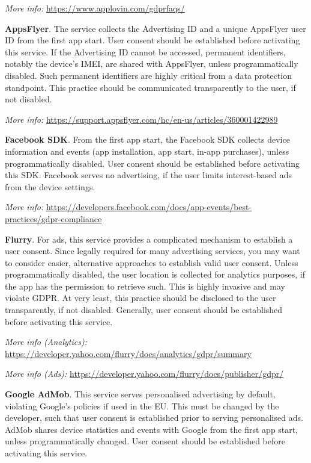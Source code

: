 \documentclass[
]{book}
\begin{document}
\emph{More info:} \url{https://www.applovin.com/gdprfaqs/}

\textbf{AppsFlyer}. The service collects the Advertising ID and a unique AppsFlyer user ID from the first app start. User consent should be established before activating this service. If the Advertising ID cannot be accessed, permanent identifiers, notably the device's IMEI, are shared with AppsFlyer, unless programmatically disabled. Such permanent identifiers are highly critical from a data protection standpoint. This practice should be communicated transparently to the user, if not disabled.

\emph{More info:} \url{https://support.appsflyer.com/hc/en-us/articles/360001422989}

\textbf{Facebook SDK}. From the first app start, the Facebook SDK collects device information and events (app installation, app start, in-app purchases), unless programmatically disabled. User consent should be established before activating this SDK. Facebook serves no advertising, if the user limits interest-based ads from the device settings.

\emph{More info:} \url{https://developers.facebook.com/docs/app-events/best-practices/gdpr-compliance}

\textbf{Flurry}. For ads, this service provides a complicated mechanism to establish a user consent. Since legally required for many advertising services, you may want to consider easier, alternative approaches to establish valid user consent. Unless programmatically disabled, the user location is collected for analytics purposes, if the app has the permission to retrieve such. This is highly invasive and may violate GDPR. At very least, this practice should be disclosed to the user transparently, if not disabled. Generally, user consent should be established before activating this service.

\emph{More info (Analytics):} \url{https://developer.yahoo.com/flurry/docs/analytics/gdpr/summary}

\emph{More info (Ads):} \url{https://developer.yahoo.com/flurry/docs/publisher/gdpr/}

\textbf{Google AdMob}. This service serves personalised advertising by default, violating Google's policies if used in the EU. This must be changed by the developer, such that user consent is established prior to serving personalised ads. AdMob shares device statistics and events with Google from the first app start, unless programmatically changed. User consent should be established before activating this service.
\end{document}
